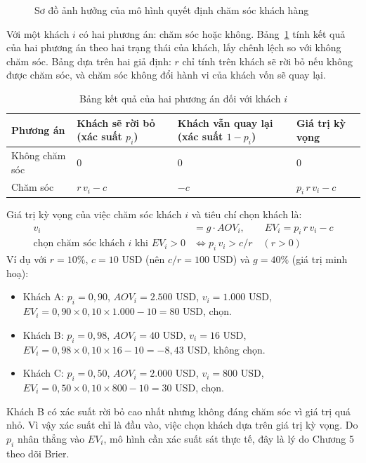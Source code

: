 \begin{figure}[!htbp]
\centering

\caption{Sơ đồ ảnh hưởng của mô hình quyết định chăm sóc khách hàng}
\label{fig:influence}
\end{figure}

Với một khách $i$ có hai phương án: chăm sóc hoặc không. Bảng~\ref{tab:payoffhai} tính kết quả của hai phương án theo hai trạng thái của khách, lấy chênh lệch so với không chăm sóc. Bảng dựa trên hai giả định: $r$ chỉ tính trên khách sẽ rời bỏ nếu không được chăm sóc, và chăm sóc không đổi hành vi của khách vốn sẽ quay lại.

\begin{table}[!htbp]
\centering
\caption{Bảng kết quả của hai phương án đối với khách $i$}
\label{tab:payoffhai}
\footnotesize
\begin{tabular}{p{3.0cm}p{4.0cm}p{4.0cm}p{2.8cm}}
\toprule
Phương án & Khách sẽ rời bỏ (xác suất $p_i$) & Khách vẫn quay lại (xác suất $1-p_i$) & Giá trị kỳ vọng \\
\midrule
Không chăm sóc & 0 & 0 & 0 \\
Chăm sóc & $r\, v_i - c$ & $-c$ & $p_i\, r\, v_i - c$ \\
\bottomrule
\end{tabular}
\end{table}

Giá trị kỳ vọng của việc chăm sóc khách $i$ và tiêu chí chọn khách là:
\begin{align}
    v_i &= g \cdot AOV_i, \qquad EV_i = p_i\, r\, v_i - c \label{eq:EV}\\
    \text{chọn chăm sóc khách } i \text{ khi } EV_i > 0 &\iff p_i\, v_i > c/r \quad (r>0) \label{eq:chon}
\end{align}
Ví dụ với $r=10\%$, $c=10$ USD (nên $c/r=100$ USD) và $g=40\%$ (giá trị minh hoạ):
\begin{itemize}
    \item Khách A: $p_i=0{,}90$, $AOV_i=2.500$ USD, $v_i=1.000$ USD, $EV_i=0{,}90 \times 0{,}10 \times 1.000 - 10 = 80$ USD, chọn.
    \item Khách B: $p_i=0{,}98$, $AOV_i=40$ USD, $v_i=16$ USD, $EV_i=0{,}98 \times 0{,}10 \times 16 - 10 = -8{,}43$ USD, không chọn.
    \item Khách C: $p_i=0{,}50$, $AOV_i=2.000$ USD, $v_i=800$ USD, $EV_i=0{,}50 \times 0{,}10 \times 800 - 10 = 30$ USD, chọn.
\end{itemize}
Khách B có xác suất rời bỏ cao nhất nhưng không đáng chăm sóc vì giá trị quá nhỏ. Vì vậy xác suất chỉ là đầu vào, việc chọn khách dựa trên giá trị kỳ vọng. Do $p_i$ nhân thẳng vào $EV_i$, mô hình cần xác suất sát thực tế, đây là lý do Chương 5 theo dõi Brier.

